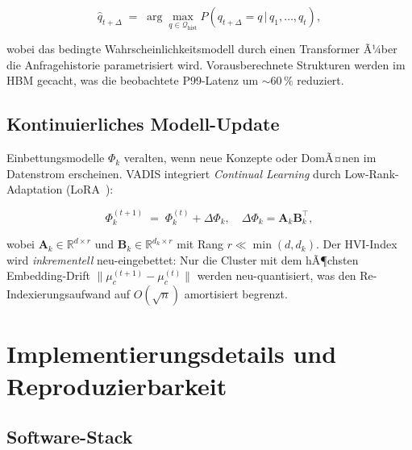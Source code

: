 ﻿\documentclass[12pt,a4paper]{article}
\begin{document}
\begin{equation}
  \hat{q}_{t+\Delta} \;=\; \arg\max_{q \in \mathcal{Q}_{\text{hist}}}
  P\!\left(q_{t+\Delta} = q \,|\, q_1, \ldots, q_t\right),
\end{equation}

wobei das bedingte Wahrscheinlichkeitsmodell durch einen
Transformer Ã¼ber die Anfragehistorie parametrisiert wird.
Vorausberechnete Strukturen werden im HBM gecacht, was die
beobachtete P99-Latenz um $\sim 60\,\%$ reduziert.

\subsection{Kontinuierliches Modell-Update}

Einbettungsmodelle $\Phi_k$ veralten, wenn neue Konzepte oder
DomÃ¤nen im Datenstrom erscheinen. VADIS integriert
\emph{Continual Learning} durch Low-Rank-Adaptation
(LoRA~\cite{hu2021lora}):

\begin{equation}
  \Phi_k^{(t+1)} \;=\; \Phi_k^{(t)} + \Delta\Phi_k,
  \quad \Delta\Phi_k = \mathbf{A}_k \mathbf{B}_k^\top,
\end{equation}

wobei $\mathbf{A}_k \in \mathbb{R}^{d \times r}$ und
$\mathbf{B}_k \in \mathbb{R}^{d_k \times r}$ mit
Rang $r \ll \min(d, d_k)$. Der HVI-Index wird \emph{inkrementell}
neu-eingebettet: Nur die Cluster mit dem hÃ¶chsten
Embedding-Drift $\|\mu_c^{(t+1)} - \mu_c^{(t)}\|$ werden
neu-quantisiert, was den Re-Indexierungsaufwand auf
$O(\sqrt{n})$ amortisiert begrenzt.

\section{Implementierungsdetails und Reproduzierbarkeit}
\label{sec:impl}

\subsection{Software-Stack}
\end{document}
